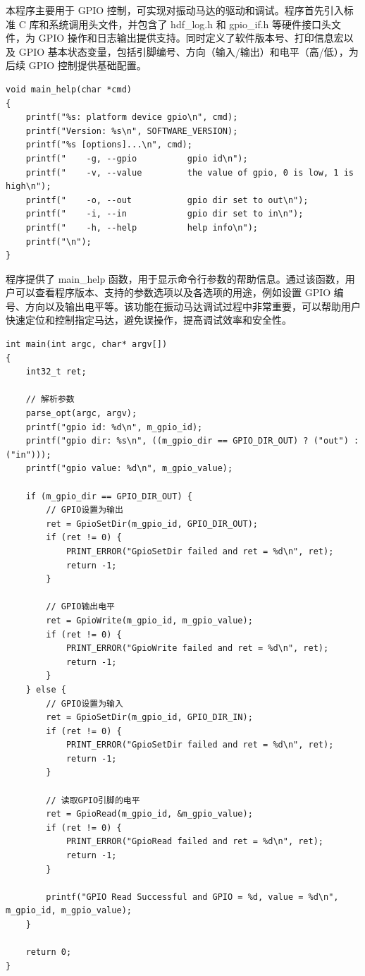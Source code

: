本程序主要用于 GPIO 控制，可实现对振动马达的驱动和调试。程序首先引入标准 C 库和系统调用头文件，并包含了 hdf_log.h 和 gpio_if.h 等硬件接口头文件，为 GPIO 操作和日志输出提供支持。同时定义了软件版本号、打印信息宏以及 GPIO 基本状态变量，包括引脚编号、方向（输入/输出）和电平（高/低），为后续 GPIO 控制提供基础配置。
\begin{lstlisting}
void main_help(char *cmd)
{
    printf("%s: platform device gpio\n", cmd);
    printf("Version: %s\n", SOFTWARE_VERSION);
    printf("%s [options]...\n", cmd);
    printf("    -g, --gpio          gpio id\n");
    printf("    -v, --value         the value of gpio, 0 is low, 1 is high\n");
    printf("    -o, --out           gpio dir set to out\n");
    printf("    -i, --in            gpio dir set to in\n");
    printf("    -h, --help          help info\n");
    printf("\n");
}
\end{lstlisting}

程序提供了 main_help 函数，用于显示命令行参数的帮助信息。通过该函数，用户可以查看程序版本、支持的参数选项以及各选项的用途，例如设置 GPIO 编号、方向以及输出电平等。该功能在振动马达调试过程中非常重要，可以帮助用户快速定位和控制指定马达，避免误操作，提高调试效率和安全性。

\begin{lstlisting}
int main(int argc, char* argv[])
{
    int32_t ret;

    // 解析参数
    parse_opt(argc, argv);
    printf("gpio id: %d\n", m_gpio_id);
    printf("gpio dir: %s\n", ((m_gpio_dir == GPIO_DIR_OUT) ? ("out") : ("in")));
    printf("gpio value: %d\n", m_gpio_value);

    if (m_gpio_dir == GPIO_DIR_OUT) {
        // GPIO设置为输出
        ret = GpioSetDir(m_gpio_id, GPIO_DIR_OUT);
        if (ret != 0) {
            PRINT_ERROR("GpioSetDir failed and ret = %d\n", ret);
            return -1;
        }

        // GPIO输出电平
        ret = GpioWrite(m_gpio_id, m_gpio_value);
        if (ret != 0) {
            PRINT_ERROR("GpioWrite failed and ret = %d\n", ret);
            return -1;
        }
    } else {
        // GPIO设置为输入
        ret = GpioSetDir(m_gpio_id, GPIO_DIR_IN);
        if (ret != 0) {
            PRINT_ERROR("GpioSetDir failed and ret = %d\n", ret);
            return -1;
        }

        // 读取GPIO引脚的电平
        ret = GpioRead(m_gpio_id, &m_gpio_value);
        if (ret != 0) {
            PRINT_ERROR("GpioRead failed and ret = %d\n", ret);
            return -1;
        }

        printf("GPIO Read Successful and GPIO = %d, value = %d\n", m_gpio_id, m_gpio_value);
    }

    return 0;
}
\end{lstlisting}


